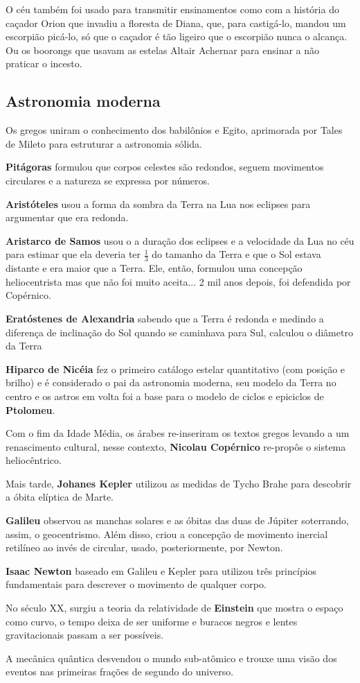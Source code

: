 \documentclass{article}
\begin{document}
O céu também foi usado para transmitir ensinamentos como com a história 
do caçador Orion que invadiu a floresta de Diana, que, para castigá-lo,
mandou um escorpião picá-lo, só que o caçador é tão ligeiro que o 
escorpião nunca o alcança. Ou os boorongs que usavam as estelas Altair 
Achernar para ensinar a não praticar o incesto. 

\subsection{Astronomia moderna}

Os gregos uniram o conhecimento dos babilônios e Egito, aprimorada 
por Tales de Mileto para estruturar a astronomia sólida.

\textbf{Pitágoras} formulou que corpos celestes são redondos, seguem movimentos
circulares e a natureza se expressa por números.

\textbf{Aristóteles} usou a forma da sombra da Terra na Lua nos eclipses para
argumentar que era redonda.

\textbf{Aristarco de Samos} usou o a duração dos eclipses e a velocidade da 
Lua no céu para estimar que ela deveria ter $\frac{1}{3}$ do tamanho
da Terra e que o Sol estava distante e era maior que a Terra. Ele, 
então, formulou uma concepção heliocentrista mas que não foi muito 
aceita... 2 mil anos depois, foi defendida por Copérnico.

\textbf{Eratóstenes de Alexandria} sabendo que a Terra é redonda e medindo 
a diferença de inclinação do Sol quando se caminhava para Sul, 
calculou o diâmetro da Terra

\textbf{Hiparco de Nicéia} fez o primeiro catálogo estelar quantitativo (com
posição e brilho) e é considerado o pai da astronomia moderna, seu
modelo da Terra no centro e os astros em volta foi a base para o 
modelo de ciclos e epiciclos de \textbf{Ptolomeu}.

Com o fim da Idade Média, os árabes re-inseriram os textos gregos 
levando a um renascimento cultural, nesse contexto, \textbf{Nicolau Copérnico }
re-propôs o sistema heliocêntrico.

Mais tarde, \textbf{Johanes Kepler} utilizou as medidas de Tycho Brahe para 
descobrir a óbita elíptica de Marte.

\textbf{Galileu} observou as manchas solares e as óbitas das duas de Júpiter 
soterrando, assim, o geocentrismo. Além disso, criou a concepção de 
movimento inercial retilíneo ao invés de circular, usado, posteriormente,
por Newton.

\textbf{Isaac Newton} baseado em Galileu e Kepler para utilizou três princípios 
fundamentais para descrever o movimento de qualquer corpo.

No século XX, surgiu a teoria da relatividade de \textbf{Einstein} que mostra
o espaço como curvo, o tempo deixa de ser uniforme e buracos negros 
e lentes gravitacionais passam a ser possíveis.

A mecânica quântica desvendou o mundo sub-atômico e trouxe uma visão
dos eventos nas primeiras frações de segundo do universo.
\end{document}
